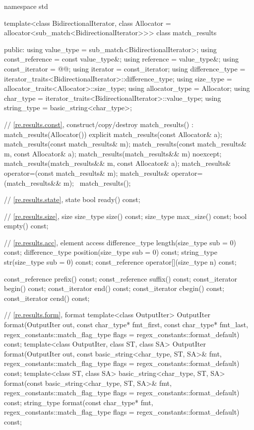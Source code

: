 \begin{codeblock}
namespace std {
  template<class BidirectionalIterator,
           class Allocator = allocator<sub_match<BidirectionalIterator>>>
    class match_results {
    public:
      using value_type      = sub_match<BidirectionalIterator>;
      using const_reference = const value_type&;
      using reference       = value_type&;
      using const_iterator  = @@;
      using iterator        = const_iterator;
      using difference_type = iterator_traits<BidirectionalIterator>::difference_type;
      using size_type       = allocator_traits<Allocator>::size_type;
      using allocator_type  = Allocator;
      using char_type       = iterator_traits<BidirectionalIterator>::value_type;
      using string_type     = basic_string<char_type>;

      // \ref{re.results.const}, construct/copy/destroy
      match_results() : match_results(Allocator()) {}
      explicit match_results(const Allocator& a);
      match_results(const match_results& m);
      match_results(const match_results& m, const Allocator& a);
      match_results(match_results&& m) noexcept;
      match_results(match_results&& m, const Allocator& a);
      match_results& operator=(const match_results& m);
      match_results& operator=(match_results&& m);
      ~match_results();

      // \ref{re.results.state}, state
      bool ready() const;

      // \ref{re.results.size}, size
      size_type size() const;
      size_type max_size() const;
      bool empty() const;

      // \ref{re.results.acc}, element access
      difference_type length(size_type sub = 0) const;
      difference_type position(size_type sub = 0) const;
      string_type str(size_type sub = 0) const;
      const_reference operator[](size_type n) const;

      const_reference prefix() const;
      const_reference suffix() const;
      const_iterator begin() const;
      const_iterator end() const;
      const_iterator cbegin() const;
      const_iterator cend() const;

      // \ref{re.results.form}, format
      template<class OutputIter>
        OutputIter
          format(OutputIter out,
                 const char_type* fmt_first, const char_type* fmt_last,
                 regex_constants::match_flag_type flags = regex_constants::format_default) const;
      template<class OutputIter, class ST, class SA>
        OutputIter
          format(OutputIter out,
                 const basic_string<char_type, ST, SA>& fmt,
                 regex_constants::match_flag_type flags = regex_constants::format_default) const;
      template<class ST, class SA>
        basic_string<char_type, ST, SA>
          format(const basic_string<char_type, ST, SA>& fmt,
                 regex_constants::match_flag_type flags = regex_constants::format_default) const;
      string_type
        format(const char_type* fmt,
               regex_constants::match_flag_type flags = regex_constants::format_default) const;

}}
\end{codeblock}
